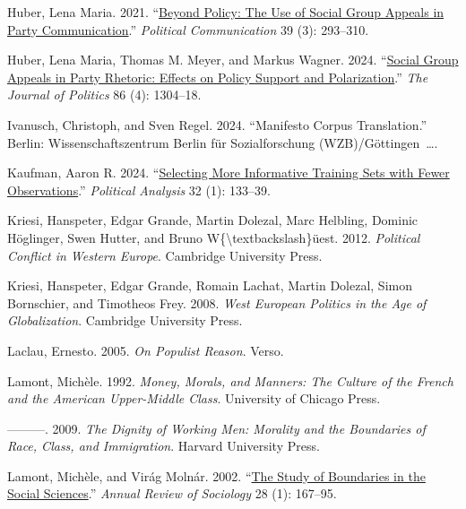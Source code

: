 \documentclass[12pt]{article}
\begin{document}
\begin{CSLReferences}{1}{0}
Huber, Lena Maria. 2021. {``\href{https://doi.org/10.1080/10584609.2021.1998264}{Beyond Policy: The Use of Social Group Appeals in Party Communication}.''} \emph{Political Communication} 39 (3): 293--310.

Huber, Lena Maria, Thomas M. Meyer, and Markus Wagner. 2024. {``\href{https://doi.org/10.1086/729946}{Social Group Appeals in Party Rhetoric: Effects on Policy Support and Polarization}.''} \emph{The Journal of Politics} 86 (4): 1304--18.

Ivanusch, Christoph, and Sven Regel. 2024. {``Manifesto Corpus Translation.''} Berlin: Wissenschaftszentrum Berlin f{ü}r Sozialforschung (WZB)/G{ö}ttingen~\ldots.

Kaufman, Aaron R. 2024. {``\href{https://www.cambridge.org/core/journals/political-analysis/article/selecting-more-informative-training-sets-with-fewer-observations/FCC76C9F7A5B27D00B0C9BE023BF84E7}{Selecting More Informative Training Sets with Fewer Observations}.''} \emph{Political Analysis} 32 (1): 133--39.

Kriesi, Hanspeter, Edgar Grande, Martin Dolezal, Marc Helbling, Dominic Höglinger, Swen Hutter, and Bruno W\{\textbackslash textbackslash\}üest. 2012. \emph{Political Conflict in Western Europe}. Cambridge University Press.

Kriesi, Hanspeter, Edgar Grande, Romain Lachat, Martin Dolezal, Simon Bornschier, and Timotheos Frey. 2008. \emph{West European Politics in the Age of Globalization}. Cambridge University Press.

Laclau, Ernesto. 2005. \emph{On Populist Reason}. Verso.

Lamont, Michèle. 1992. \emph{Money, Morals, and Manners: The Culture of the French and the American Upper-Middle Class}. University of Chicago Press.

---------. 2009. \emph{The Dignity of Working Men: Morality and the Boundaries of Race, Class, and Immigration}. Harvard University Press.

Lamont, Michèle, and Virág Molnár. 2002. {``\href{https://doi.org/10.1146/annurev.soc.28.110601.141107}{The Study of Boundaries in the Social Sciences}.''} \emph{Annual Review of Sociology} 28 (1): 167--95.


\end{CSLReferences}
\end{document}
